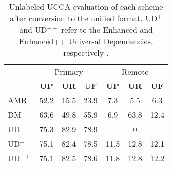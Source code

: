 \documentclass[11pt,a4paper]{article}
\begin{document}
\begin{table}
\begin{tabular}{lccc|ccc}
& \multicolumn{3}{c|}{Primary} & \multicolumn{3}{c}{Remote} \\
& \textbf{UP} & \textbf{UR} & \textbf{UF} & \textbf{UP} & \textbf{UR} & \textbf{UF} \\
AMR & 52.2 & 15.5 & 23.9 & 7.3 & 5.5 & 6.3 \\
DM & 63.6 & 49.8 & 55.9 & 6.9 & 63.8 & 12.4 \\
UD & 75.3 & 82.9 & 78.9 & -- & 0 & -- \\
UD$^+$ & 75.1 & 82.4 & 78.5 & 11.5 & 12.8 & 12.1 \\
UD$^{++}$ & 75.1 & 82.5 & 78.6 & 11.8 & 12.8 & 12.2
\end{tabular}
\caption{Unlabeled UCCA evaluation of each scheme after conversion to the unified format.
UD$^+$ and UD$^{++}$ refer to the Enhanced and Enhanced++ Universal Dependencies,
respectively \cite{SCHUSTER16.779}.\label{tab:common}}
\end{table}




\end{document}
